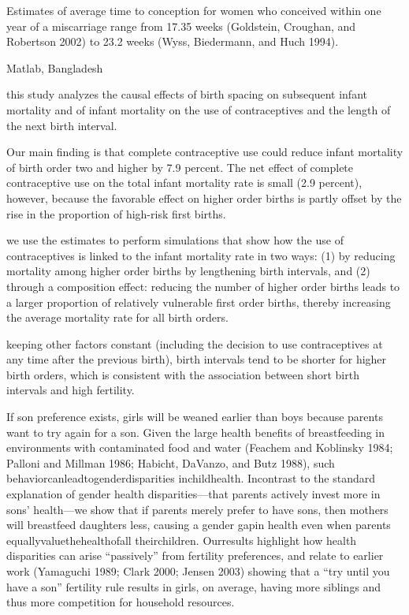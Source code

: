 Estimates of average time to conception for women who conceived within one year of 
a miscarriage range from 17.35 weeks (Goldstein, Croughan, and Robertson 2002) to 23.2
weeks (Wyss, Biedermann, and Huch 1994).

\citet{Saha2013}

Matlab, Bangladesh

this study analyzes the causal effects of birth spacing on subsequent
infant mortality and of infant mortality on the use of contraceptives
and the length of the next birth interval.

Our main finding is that complete contraceptive use could reduce infant
mortality of birth order two and higher by 7.9 percent. The net effect
of complete contraceptive use on the total infant mortality rate is
small (2.9 percent), however, because the favorable effect on higher
order births is partly offset by the rise in the proportion of high-risk
first births.

we use the estimates to perform simulations that show how the use of
contraceptives is linked to the infant mortality rate in two ways: (1)
by reducing mortality among higher order births by lengthening birth
intervals, and (2) through a composition effect: reducing the number of
higher order births leads to a larger proportion of relatively
vulnerable first order births, thereby increasing the average mortality
rate for all birth orders.

keeping other factors constant (including the decision to use
contraceptives at any time after the previous birth), birth intervals
tend to be shorter for higher birth orders, which is consistent with the
association between short birth intervals and high fertility.

\citep{Jayachandran2011}

If son preference exists, girls will be weaned earlier than boys because
parents want to try again for a son. Given the large health benefits of
breastfeeding in environments with contaminated food and water (Feachem
and Koblinsky 1984; Palloni and Millman 1986; Habicht, DaVanzo, and Butz
1988), such behaviorcanleadtogenderdisparities inchildhealth. Incontrast
to the standard explanation of gender health disparities—that parents
actively invest more in sons’ health—we show that if parents merely
prefer to have sons, then mothers will breastfeed daughters less,
causing a gender gapin health even when parents
equallyvaluethehealthofall theirchildren. Ourresults highlight how
health disparities can arise “passively” from fertility preferences, and
relate to earlier work (Yamaguchi 1989; Clark 2000; Jensen 2003) showing
that a “try until you have a son” fertility rule results in girls, on
average, having more siblings and thus more competition for household
resources.

